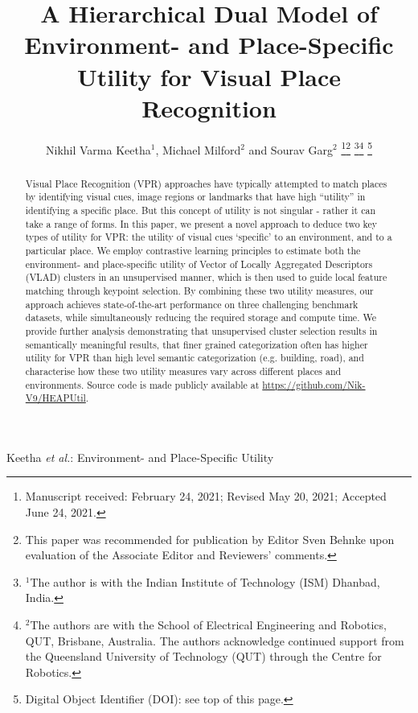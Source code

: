 \documentclass[letterpaper, 10 pt, conference]{ieeeconf}  \fi
\begin{document}
\title{
\ifarxiv\LARGE \bf\fi
A Hierarchical Dual Model of Environment- and Place-Specific Utility for Visual Place Recognition
}


\author{Nikhil Varma Keetha$^{1}$, Michael Milford$^{2}$ and Sourav Garg$^{2}$\ifralfinal
\thanks{Manuscript received: February 24, 2021; Revised May 20, 2021; Accepted June 24, 2021.}\thanks{This paper was recommended for publication by Editor Sven Behnke upon evaluation of the Associate Editor and Reviewers' comments.
} \fi
\thanks{$^{1}$The author is with the Indian Institute of Technology (ISM) Dhanbad, India.
}\thanks{$^{2}$The authors are with the School of Electrical Engineering and Robotics, QUT, Brisbane, Australia. The authors acknowledge continued support from the Queensland University of Technology (QUT) through the Centre for Robotics.
}\ifralfinal
\thanks{Digital Object Identifier (DOI): see top of this page.} \fi
}



\ifralfinal
{}
{Keetha \MakeLowercase{\textit{et al.}}: Environment- and Place-Specific Utility}
\fi

\maketitle
\ifarxiv
\thispagestyle{fancy}
\pagestyle{plain}
\fi



\begin{abstract}
Visual Place Recognition (VPR) approaches have typically attempted to match places by identifying visual cues, image regions or landmarks that have high ``utility'' in identifying a specific place. But this concept of utility is not singular - rather it can take a range of forms. In this paper, we present a novel approach to deduce two key types of utility for VPR: the utility of visual cues `specific' to an environment, and to a particular place. We employ contrastive learning principles to estimate both the environment- and place-specific utility of Vector of Locally Aggregated Descriptors (VLAD) clusters in an unsupervised manner, which is then used to guide local feature matching through keypoint selection. By combining these two utility measures, our approach achieves state-of-the-art performance on three challenging benchmark datasets, while simultaneously reducing the required storage and compute time. We provide further analysis demonstrating that unsupervised cluster selection results in semantically meaningful results, that finer grained categorization often has higher utility for VPR than high level semantic categorization (e.g. building, road), and characterise how these two utility measures vary across different places and environments. Source code is made publicly available at \url{https://github.com/Nik-V9/HEAPUtil}.
\end{abstract}
\end{document}
